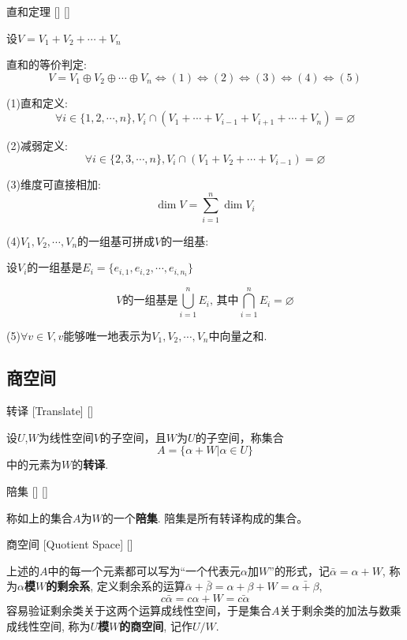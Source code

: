\documentclass[UTF8]{ctexart}
\begin{document}
		\begin{thm}
			[]
			{直和定理}
			[]
			[]

			设$V=V_1+V_2+\cdots+V_n$
		
			直和的等价判定: $$V=V_1\oplus V_2\oplus\cdots\oplus V_n\Longleftrightarrow(1)\Longleftrightarrow(2)\Longleftrightarrow(3)\Longleftrightarrow(4)\Longleftrightarrow(5)$$
			
			(1)直和定义: $$\forall i\in\{1,2,\cdots,n\}, V_i\cap(V_1+\cdots+V_{i-1}+V_{i+1}+\cdots+V_n)=\varnothing$$
			
			(2)减弱定义: $$\forall i\in\{2,3,\cdots,n\}, V_i\cap(V_1+V_2+\cdots+V_{i-1})=\varnothing$$
			
			(3)维度可直接相加: $$\dim V=\sum_{i=1}^n\dim V_i$$
			
			(4)$V_1,V_2,\cdots,V_n$的一组基可拼成$V$的一组基: 
			
			设$V_i$的一组基是$E_i=\{e_{i,1},e_{i,2},\cdots,e_{i,n_i}\}$
			
			$$V\mbox{的一组基是}\bigcup_{i=1}^nE_i\mbox{, 其中}\bigcap_{i=1}^nE_i=\varnothing$$
			
			(5)$\forall v\in V, v$能够唯一地表示为$V_1,V_2,\cdots,V_n$中向量之和. 
		\end{thm}

	\subsection{商空间}

		\begin{dfn}
			[]
			{转译}
			[Translate]
			[]

			设$U$,$W$为线性空间$V$的子空间，且$W$为$U$的子空间，称集合\[A=\{\alpha+W|\alpha\in U\}\]中的元素为$W$的\textbf{转译}.
		\end{dfn}

		\begin{dfn}
			[]
			{陪集}
			[]
			[]

			称如上的集合$A$为$W$的一个\textbf{陪集}. 陪集是所有转译构成的集合。
		\end{dfn}

        \begin{dfn}
			[]
			{商空间}
			[Quotient Space]
			[]

			上述的$A$中的每一个元素都可以写为“一个代表元$\alpha$加$W$”的形式，记$\bar{\alpha}=\alpha+W$, 称为\textbf{$\alpha$模$W$的剩余系}, 定义剩余系的运算$\bar{\alpha}+\bar{\beta}=\alpha+\beta+W=\bar{\alpha+\beta}$, 
            $$c\bar{\alpha}=c\alpha+W=\bar{c\alpha}$$
            容易验证剩余类关于这两个运算成线性空间，于是集合$A$关于剩余类的加法与数乘成线性空间, 称为\textbf{$U$模$W$的商空间}, 记作$U/W$.
		\end{dfn}
  
\end{document}

